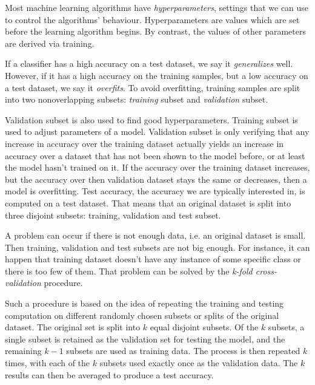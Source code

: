 Most machine learning algorithms have \textit{hyperparameters}, settings that we can use to control the algorithms' behaviour. Hyperparameters are values which are set before the learning algorithm begins. By contrast, the values of other parameters are derived via training. 

If a classifier has a high accuracy on a test dataset, we say it \textit{generalizes} well. However, if it has a high accuracy on the training samples, but a low accuracy on a test dataset, we say it \textit{overfits}. To avoid overfitting, training samples are split into two nonoverlapping subsets: \textit{training} subset and \textit{validation} subset.

Validation subset is also used to find good hyperparameters. Training subset is used to adjust parameters of a model. Validation subset is only verifying that any increase in accuracy over the training dataset actually yields an increase in accuracy over a dataset that has not been shown to the model before, or at least the model hasn't trained on it. If the accuracy over the training dataset increases, but the accuracy over then validation dataset stays the same or decreases, then a model is overfitting. Test accuracy, the accuracy we are typically interested in, is computed on a test dataset. That means that an original dataset is split into three disjoint subsets: training, validation and test subset. 

A problem can occur if there is not enough data, i.e. an original dataset is small. Then training, validation and test subsets are not big enough. For instance, it can happen that training dataset doesn't have any instance of some specific class or there is too few of them. That problem can be solved by the \textit{k-fold cross-validation} procedure.

Such a procedure is based on the idea of repeating the training and testing computation on different randomly chosen subsets or splits of the original dataset. The original set is split into $k$ equal disjoint subsets. Of the $k$ subsets, a single subset is retained as the validation set for testing the model, and the remaining $k-1$ subsets are used as training data. The process is then repeated $k$ times, with each of the $k$ subsets used exactly once as the validation data. The $k$ results can then be averaged to produce a test accuracy. 

  

